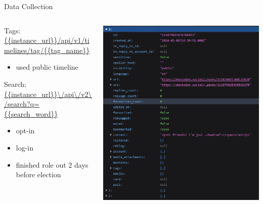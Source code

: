 \begin{frame}{Data Collection}
		\begin{columns}
		
		\begin{column}{0.65\textwidth}
			\begin{tcolorbox}[enhanced jigsaw, colback=white, opacityback=.4, colframe=ElixirPurple, arc=3mm, boxrule=0mm, height=0.8\textheight, valign=center, title=Endpoints]
				Tags: \url{ {{instance_url}}/api/v1/timelines/tag/{{tag_name}} }
				\begin{itemize}
					\item used public timeline
				\end{itemize}
				Search: \url{ {{instance\_url}}\/api\/v2\/search?q={{search\_word}} }
				\begin{itemize}
					\item opt-in
					\item log-in
					\item finished role out 2 days before election
				\end{itemize}
			\end{tcolorbox}
		\end{column}
		
		\begin{column}{0.45\textwidth}
			\begin{tcolorbox}[enhanced jigsaw, colback=white, opacityback=.4, colframe=ElixirPurple, arc=3mm, boxrule=0mm, height=0.8\textheight, valign=center, title=Tags]
				\includegraphics[height=\tcbtextheight,   keepaspectratio]{pictures/tag_bayern.png}
			\end{tcolorbox}
		\end{column}
		
	\end{columns}
\end{frame}

